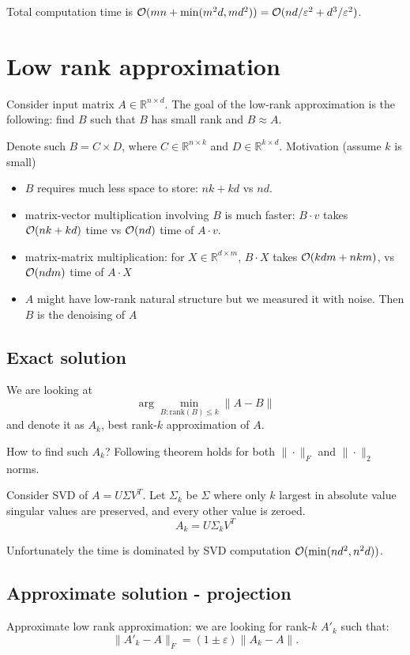 \documentclass[11pt]{article}
\begin{document}
Total computation time is $\mathcal{O}(mn + \min(m^2d,md^2)) = \mathcal{O}(nd/\varepsilon^2 + d^3 / \varepsilon^2)$.

\section{Low rank approximation}
Consider input matrix $A \in \mathbb{R}^{n \times d}$. The goal of the low-rank approximation is the following:
find $B$ such that  $B$ has small rank and $B \approx A$.

Denote such $B = C \times D$, where $C \in \mathbb{R}^{n \times k}$ and $D \in \mathbb{R}^{k \times d}$. Motivation (assume $k$ is small)
\begin{itemize}
\item $B$ requires much less space to store: $nk + kd$ vs $nd$.
\item matrix-vector  multiplication involving $B$ is much faster: $B \cdot v$ takes $\mathcal{O}(nk + kd)$ time vs $\mathcal{O}(nd)$ time of $A \cdot v$.
\item matrix-matrix multiplication: for $X \in \mathbb{R}^{d \times m}$, $B \cdot X$ takes $\mathcal{O}(kdm + nkm)$, vs $\mathcal{O}(ndm)$ time  of $A \cdot X$
\item $A$ might have low-rank natural structure but we measured it with noise. Then $B$ is the denoising of $A$
\end{itemize}
\subsection{Exact solution}
We are looking at
$$ \arg \min_{B : \textrm{rank}(B)\le k} \|A-B\|$$ 
and denote it as $A_k$, best rank-$k$ approximation of $A$.

How to find such $A_k$? Following theorem holds for both $\|\cdot\|_F$ and $\|\cdot\|_2$ norms.



\begin{theorem}
Consider SVD of $A = U \Sigma V^T$. Let $\Sigma_k$ be $\Sigma$ where only $k$ largest in absolute value singular values are preserved, and every other value is zeroed.
\begin{equation}
\label{eq:bestrankk}
A_k = U \Sigma_k V^T
\end{equation}
\end{theorem}

Unfortunately the time is dominated by SVD computation $\mathcal{O}(\min(nd^2,n^2d))$.

\subsection{Approximate solution - projection}
Approximate low rank approximation: we are looking for rank-$k$ $A'_k$ such that:
$$\|A'_k - A\|_F = (1\pm \varepsilon) \|A_k - A\|.$$
\end{document}
